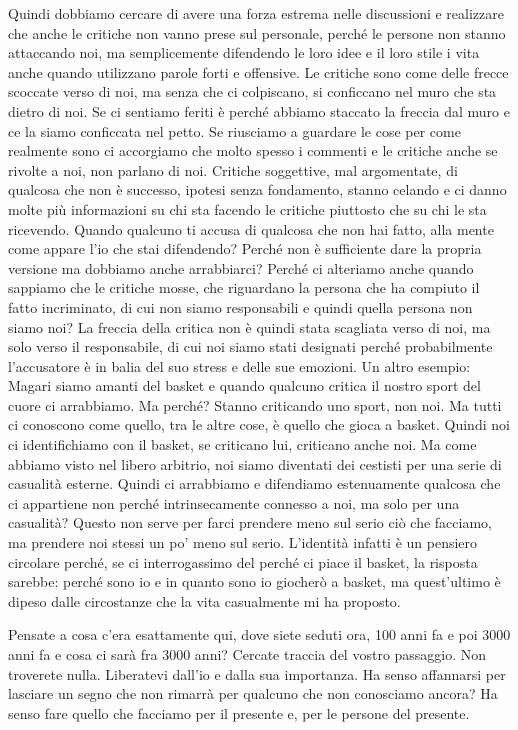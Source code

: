 \documentclass[12pt]{book} %
\begin{document}
Quindi dobbiamo cercare di avere una forza estrema nelle discussioni e realizzare che anche le critiche non vanno prese
sul personale, perché le persone non stanno attaccando noi, ma semplicemente difendendo le loro idee e il loro stile i
vita anche quando utilizzano parole forti e offensive. Le critiche sono come delle frecce scoccate verso di noi, ma
senza che ci colpiscano, si conficcano nel muro che sta dietro di noi. Se ci sentiamo feriti è perché abbiamo staccato
la freccia dal muro e ce la siamo conficcata nel petto. Se riusciamo a guardare le cose per come realmente sono ci
accorgiamo che molto spesso i commenti e le critiche anche se rivolte a noi, non parlano di noi. Critiche soggettive,
mal argomentate, di qualcosa che non è successo, ipotesi senza fondamento, stanno celando e ci danno molte più
informazioni su chi sta facendo le critiche piuttosto che su chi le sta ricevendo. Quando qualcuno ti accusa di
qualcosa che non hai fatto, alla mente come appare l'io che stai difendendo? Perché non è
sufficiente dare la propria versione ma dobbiamo anche arrabbiarci? Perché ci alteriamo anche quando sappiamo che le
critiche mosse, che riguardano la persona che ha compiuto il fatto incriminato, di cui non siamo responsabili e quindi
quella persona non siamo noi? La freccia della critica non è quindi stata scagliata verso di noi, ma solo verso il
responsabile, di cui noi siamo stati designati perché probabilmente l'accusatore è in balia del
suo stress e delle sue emozioni. Un altro esempio: Magari siamo amanti del basket e quando qualcuno critica il nostro
sport del cuore ci arrabbiamo. Ma perché? Stanno criticando uno sport, non noi. Ma tutti ci conoscono come quello, tra
le altre cose, è quello che gioca a basket. Quindi noi ci identifichiamo con il basket, se criticano lui, criticano
anche noi. Ma come abbiamo visto nel libero arbitrio, noi siamo diventati dei cestisti per una serie di casualità
esterne. Quindi ci arrabbiamo e difendiamo estenuamente qualcosa che ci appartiene non perché intrinsecamente connesso
a noi, ma solo per una casualità? Questo non serve per farci prendere meno sul serio ciò che facciamo, ma prendere noi
stessi un po' meno sul serio. L'identità infatti è un pensiero circolare
perché, se ci interrogassimo del perché ci piace il basket, la risposta sarebbe: perché sono io e in quanto sono io
giocherò a basket, ma quest'ultimo è dipeso dalle circostanze che la vita casualmente mi ha
proposto.\newline

\begin{mdframed}[linewidth=1pt]
Pensate a cosa c'era esattamente qui, dove siete seduti ora, 100 anni fa e poi 3000 anni fa e cosa ci sarà fra 3000
anni? Cercate traccia del vostro passaggio. Non troverete nulla. Liberatevi dall'io e dalla sua importanza. Ha senso
affannarsi per lasciare un segno che non rimarrà per qualcuno che non conosciamo ancora? Ha senso fare quello che
facciamo per il presente e, per le persone del presente.
\end{mdframed}
\end{document}
